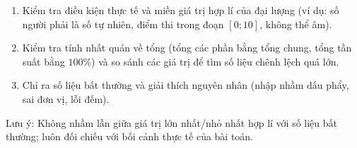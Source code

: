 \begin{enumerate}
\item Kiểm tra điều kiện thực tế và miền giá trị hợp lí của đại lượng (ví dụ: số người phải là số tự nhiên, điểm thi trong đoạn $[0; 10]$, không thể âm).
\item Kiểm tra tính nhất quán về tổng (tổng các phần bằng tổng chung, tổng tần suất bằng $100\%$) và so sánh các giá trị để tìm số liệu chênh lệch quá lớn.
\item Chỉ ra số liệu bất thường và giải thích nguyên nhân (nhập nhầm dấu phẩy, sai đơn vị, lỗi đếm).
\end{enumerate}
Lưu ý: Không nhầm lẫn giữa giá trị lớn nhất/nhỏ nhất hợp lí với số liệu bất thường; luôn đối chiếu với bối cảnh thực tế của bài toán.
